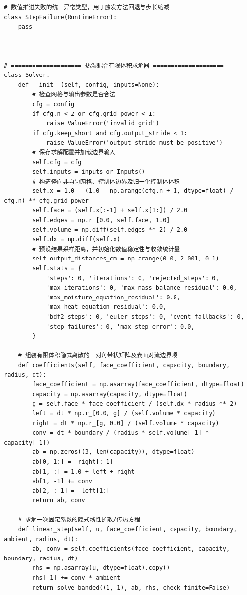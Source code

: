 \begin{Verbatim}[fontsize=\scriptsize,breaklines=true,breakanywhere=true]
# 数值推进失败的统一异常类型，用于触发方法回退与步长缩减
class StepFailure(RuntimeError):
    pass



# ==================== 热湿耦合有限体积求解器 ====================
class Solver:
    def __init__(self, config, inputs=None):
        # 检查网格与输出参数是否合法
        cfg = config
        if cfg.n < 2 or cfg.grid_power < 1:
            raise ValueError('invalid grid')
        if cfg.keep_short and cfg.output_stride < 1:
            raise ValueError('output_stride must be positive')
        # 保存求解配置并加载边界输入
        self.cfg = cfg
        self.inputs = inputs or Inputs()
        # 构造径向非均匀网格、控制体边界及归一化控制体体积
        self.x = 1.0 - (1.0 - np.arange(cfg.n + 1, dtype=float) / cfg.n) ** cfg.grid_power
        self.face = (self.x[:-1] + self.x[1:]) / 2.0
        self.edges = np.r_[0.0, self.face, 1.0]
        self.volume = np.diff(self.edges ** 2) / 2.0
        self.dx = np.diff(self.x)
        # 预设结果采样距离，并初始化数值稳定性与收敛统计量
        self.output_distances_cm = np.arange(0.0, 2.001, 0.1)
        self.stats = {
            'steps': 0, 'iterations': 0, 'rejected_steps': 0,
            'max_iterations': 0, 'max_mass_balance_residual': 0.0,
            'max_moisture_equation_residual': 0.0,
            'max_heat_equation_residual': 0.0,
            'bdf2_steps': 0, 'euler_steps': 0, 'event_fallbacks': 0,
            'step_failures': 0, 'max_step_error': 0.0,
        }

    # 组装有限体积隐式离散的三对角带状矩阵及表面对流边界项
    def coefficients(self, face_coefficient, capacity, boundary, radius, dt):
        face_coefficient = np.asarray(face_coefficient, dtype=float)
        capacity = np.asarray(capacity, dtype=float)
        g = self.face * face_coefficient / (self.dx * radius ** 2)
        left = dt * np.r_[0.0, g] / (self.volume * capacity)
        right = dt * np.r_[g, 0.0] / (self.volume * capacity)
        conv = dt * boundary / (radius * self.volume[-1] * capacity[-1])
        ab = np.zeros((3, len(capacity)), dtype=float)
        ab[0, 1:] = -right[:-1]
        ab[1, :] = 1.0 + left + right
        ab[1, -1] += conv
        ab[2, :-1] = -left[1:]
        return ab, conv

    # 求解一次固定系数的隐式线性扩散/传热方程
    def linear_step(self, u, face_coefficient, capacity, boundary, ambient, radius, dt):
        ab, conv = self.coefficients(face_coefficient, capacity, boundary, radius, dt)
        rhs = np.asarray(u, dtype=float).copy()
        rhs[-1] += conv * ambient
        return solve_banded((1, 1), ab, rhs, check_finite=False)


\end{Verbatim}
